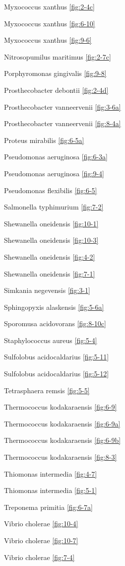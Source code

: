 \documentclass[]{tufte-book}
\begin{document}
Myxococcus xanthus \ref{fig:2-4c}

Myxococcus xanthus \ref{fig:6-10}

Myxococcus xanthus \ref{fig:9-6}

Nitrosopumilus maritimus \ref{fig:2-7c}

Porphyromonas gingivalis \ref{fig:9-8}

Prosthecobacter debontii \ref{fig:2-4d}

Prosthecobacter vanneervenii \ref{fig:3-6a}

Prosthecobacter vanneervenii \ref{fig:8-4a}

Proteus mirabilis \ref{fig:6-5a}

Pseudomonas aeruginosa \ref{fig:6-3a}

Pseudomonas aeruginosa \ref{fig:9-4}

Pseudomonas flexibilis \ref{fig:6-5}

Salmonella typhimurium \ref{fig:7-2}

Shewanella oneidensis \ref{fig:10-1}

Shewanella oneidensis \ref{fig:10-3}

Shewanella oneidensis \ref{fig:4-2}

Shewanella oneidensis \ref{fig:7-1}

Simkania negevensis \ref{fig:3-1}

Sphingopyxis alaskensis \ref{fig:5-6a}

Sporomusa acidovorans \ref{fig:8-10c}

Staphylococcus aureus \ref{fig:5-4}

Sulfolobus acidocaldarius \ref{fig:5-11}

Sulfolobus acidocaldarius \ref{fig:5-12}

Tetrasphaera remsis \ref{fig:5-5}

Thermococcus kodakaraensis \ref{fig:6-9}

Thermococcus kodakaraensis \ref{fig:6-9a}

Thermococcus kodakaraensis \ref{fig:6-9b}

Thermococcus kodakaraensis \ref{fig:8-3}

Thiomonas intermedia \ref{fig:4-7}

Thiomonas intermedia \ref{fig:5-1}

Treponema primitia \ref{fig:6-7a}

Vibrio cholerae \ref{fig:10-4}

Vibrio cholerae \ref{fig:10-7}

Vibrio cholerae \ref{fig:7-4}
\end{document}
